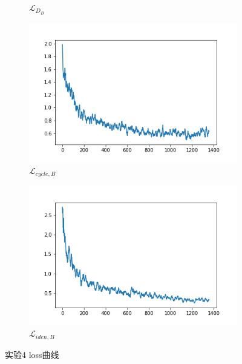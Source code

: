 \documentclass{beamer}
\begin{document}
\begin{frame}
\begin{figure}[htb]
\begin{subfigure}[b]{0.23\linewidth}
        \caption{$\mathcal{L}_{D_B}$}
      \end{subfigure}
      \begin{subfigure}[b]{0.23\linewidth}
        \includegraphics[width=\linewidth]{exp4_cycle_B.png}
        \caption{$\mathcal{L}_{cycle,B}$}
      \end{subfigure}
      \begin{subfigure}[b]{0.23\linewidth}
        \includegraphics[width=\linewidth]{exp4_idt_B.png}
        \caption{$\mathcal{L}_{iden,B}$}
      \end{subfigure}
      \caption{实验4 loss曲线}
      \label{fig:exp3loss}
\end{figure}
\end{frame}
\end{document}
